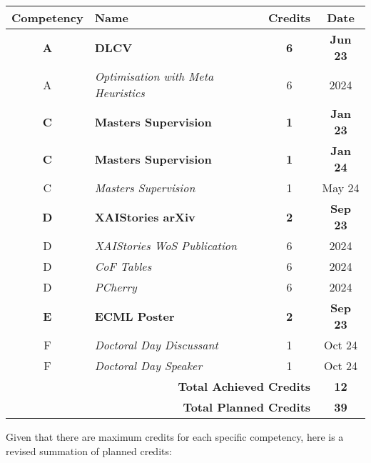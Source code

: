 \begin{tabular}{|c|l|c|c|}
    \hline
    \textbf{Competency} & \textbf{Name}                   & \textbf{Credits} & \textbf{Date}   \\ \hline
    \textbf{A}          & \textbf{DLCV}                   & \textbf{6}       & \textbf{Jun 23} \\ \hline
    A                   & \textit{Optimisation with Meta Heuristics} & 6      & 2024           \\ \hline
    \textbf{C}          & \textbf{Masters Supervision}    & \textbf{1}       & \textbf{Jan 23} \\ \hline
    \textbf{C}          & \textbf{Masters Supervision}    & \textbf{1}       & \textbf{Jan 24} \\ \hline
    C                   & \textit{Masters Supervision}    & 1                & May 24         \\ \hline
    \textbf{D}          & \textbf{XAIStories arXiv}       & \textbf{2}       & \textbf{Sep 23} \\ \hline
    D                   & \textit{XAIStories WoS Publication} & 6            & 2024           \\ \hline
    D                   & \textit{CoF Tables}             & 6                & 2024           \\ \hline
    D                   & \textit{PCherry}                & 6                & 2024           \\ \hline
    \textbf{E}          & \textbf{ECML Poster}            & \textbf{2}       & \textbf{Sep 23} \\ \hline
    F                   & \textit{Doctoral Day Discussant} & 1                & Oct 24         \\ \hline
    F                   & \textit{Doctoral Day Speaker}   & 1                & Oct 24         \\ \hline
    \multicolumn{3}{|r|}{\textbf{Total Achieved Credits}} & \textbf{12}      \\ \hline
    \multicolumn{3}{|r|}{\textbf{Total Planned Credits}}  & \textbf{39}      \\ \hline
\end{tabular}

Given that there are maximum credits for each specific competency, here is a revised summation of planned credits: \\ 

